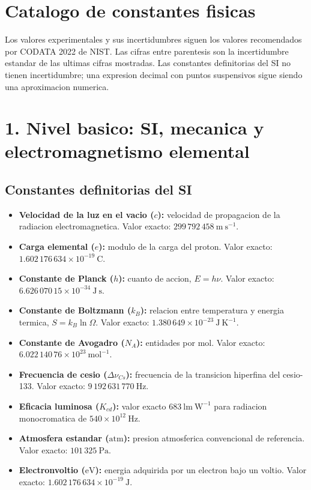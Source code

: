 \documentclass[11pt,a4paper]{article}
\begin{document}
\section*{Catalogo de constantes fisicas}

Los valores experimentales y sus incertidumbres siguen los valores recomendados por CODATA 2022 de NIST. Las cifras entre parentesis son la incertidumbre estandar de las ultimas cifras mostradas. Las constantes definitorias del SI no tienen incertidumbre; una expresion decimal con puntos suspensivos sigue siendo una aproximacion numerica.

\section*{1. Nivel basico: SI, mecanica y electromagnetismo elemental}

\subsection*{Constantes definitorias del SI}

\begin{itemize}
  \item \textbf{Velocidad de la luz en el vacio ($c$):} velocidad de propagacion de la radiacion electromagnetica. Valor exacto: $299\,792\,458\ \mathrm{m\ s^{-1}}$.
  \item \textbf{Carga elemental ($e$):} modulo de la carga del proton. Valor exacto: $1.602\,176\,634\times10^{-19}\ \mathrm{C}$.
  \item \textbf{Constante de Planck ($h$):} cuanto de accion, $E=h\nu$. Valor exacto: $6.626\,070\,15\times10^{-34}\ \mathrm{J\ s}$.
  \item \textbf{Constante de Boltzmann ($k_B$):} relacion entre temperatura y energia termica, $S=k_B\ln\Omega$. Valor exacto: $1.380\,649\times10^{-23}\ \mathrm{J\ K^{-1}}$.
  \item \textbf{Constante de Avogadro ($N_A$):} entidades por mol. Valor exacto: $6.022\,140\,76\times10^{23}\ \mathrm{mol^{-1}}$.
  \item \textbf{Frecuencia de cesio ($\Delta\nu_{Cs}$):} frecuencia de la transicion hiperfina del cesio-133. Valor exacto: $9\,192\,631\,770\ \mathrm{Hz}$.
  \item \textbf{Eficacia luminosa ($K_{cd}$):} valor exacto $683\ \mathrm{lm\ W^{-1}}$ para radiacion monocromatica de $540\times10^{12}\ \mathrm{Hz}$.
  \item \textbf{Atmosfera estandar ($\mathrm{atm}$):} presion atmosferica convencional de referencia. Valor exacto: $101\,325\ \mathrm{Pa}$.
  \item \textbf{Electronvoltio ($\mathrm{eV}$):} energia adquirida por un electron bajo un voltio. Valor exacto: $1.602\,176\,634\times10^{-19}\ \mathrm{J}$.
\end{itemize}
\end{document}
